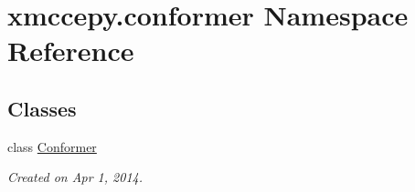 \hypertarget{namespacexmccepy_1_1conformer}{\section{xmccepy.\-conformer Namespace Reference}
\label{namespacexmccepy_1_1conformer}
}
\subsection*{Classes}
\begin{DoxyCompactItemize}
\item 
class \hyperlink{classxmccepy_1_1conformer_1_1_conformer}{Conformer}
\begin{DoxyCompactList}\small\item\em Created on Apr 1, 2014. \end{DoxyCompactList}\end{DoxyCompactItemize}
